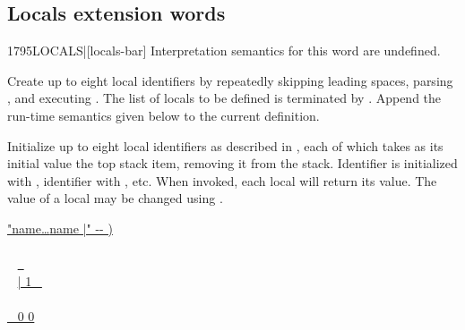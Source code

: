 \subsection{Locals extension words} %
\extended

\begin{worddef}[LOCALS]{1795}{LOCALS|}[locals-bar]
\interpret
	Interpretation semantics for this word are undefined.

\compile

	Create up to eight local identifiers by repeatedly skipping
	leading spaces, parsing , and executing
	. The list of locals to be defined
	is terminated by \param{|}. Append the run-time semantics given
	below to the current definition.

\runtime

	Initialize up to eight local identifiers as described in
	, each of which takes as its
	initial value the top stack item, removing it from the stack.
	Identifier  is initialized with ,
	identifier  with , etc. When invoked,
	each local will return its value. The value of a local may be
	changed using .

\see {}

	\begin{implement}
\cbstart{}
	\uline{\word{:}   "name{\ldots}name |" -{}- )} \\
	\tab \uline{} \\
	\tab~ \uline{  ~   } \\
	\tab~ \uline{\word{[CHAR]} | \word{-}  1 \word{-}  ~ } \\
	\tab~ \uline{} \\
	\tab \uline{  ~ 0 0 } \\
	\uline{\word{;} }
\cbend
	\end{implement}

	\begin{rationale} %
	\end{rationale}
\end{worddef}

